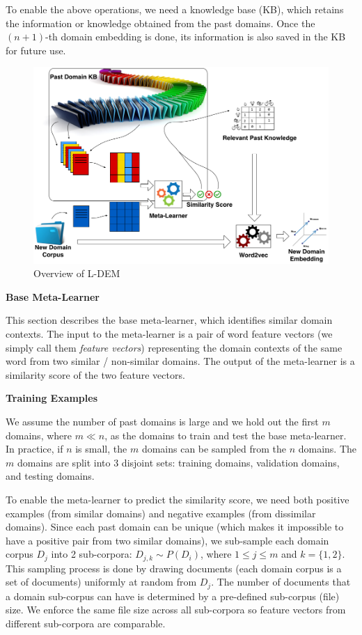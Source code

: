 To enable the above operations, we need a knowledge base (KB), which retains the information or knowledge obtained from the past domains. Once the $(n+1)$-th domain embedding is done, its information is also saved in the KB for future use.
\begin{figure}[t]
    \label{fig:ll}
    \centering    
    \includegraphics[width=5.0in]{fig/ijcai18_ll.png}
        \caption{Overview of L-DEM}
        \label{chap3:fig:fr}
    \end{figure}

\textbf{Base Meta-Learner}

This section describes the base meta-learner, which identifies similar domain contexts. The input to the meta-learner is a pair of word feature vectors (we simply call them \emph{feature vectors}) representing the domain contexts of the same word from two similar / non-similar domains.
The output of the meta-learner is a similarity score of the two feature vectors.

\textbf{Training Examples}

We assume the number of past domains is large and we hold out the first $m$ domains, where $m \ll n$, as the domains to train and test the base meta-learner.
In practice, if $n$ is small, the $m$ domains can be sampled from the $n$ domains.
The $m$ domains are split into 3 disjoint sets: training domains, validation domains, and testing domains.

To enable the meta-learner to predict the similarity score, we need both positive examples (from similar domains) and negative examples (from dissimilar domains).
Since each past domain can be unique (which makes it impossible to have a positive pair from two similar domains), we sub-sample each domain corpus $D_j$ into 2 sub-corpora: $D_{j, k} \sim P(D_i)$, where $1\le j\le m$ and $k=\{1, 2\}$.
This sampling process is done by drawing documents (each domain corpus is a set of documents) uniformly at random from $D_j$.
The number of documents that a domain sub-corpus can have is determined by a pre-defined sub-corpus (file) size.
We enforce the same file size across all sub-corpora so feature vectors from different sub-corpora are comparable.

